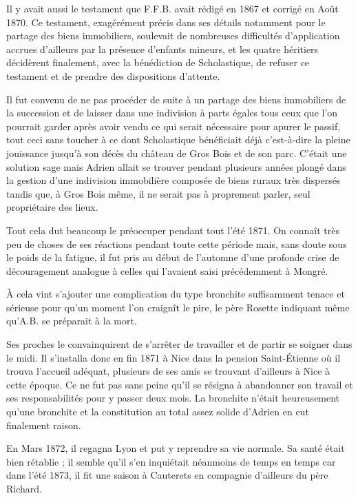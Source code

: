 \documentclass[11pt,a4paper]{report}
\begin{document}
Il y avait aussi le testament que F.F.B. avait rédigé en 1867 et corrigé en Août 1870. Ce testament, exagérément précis dans ses détails notamment pour le partage des biens immobiliers, soulevait de nombreuses difficultés d'application accrues d'ailleurs par la présence d'enfants mineurs, et les quatre héritiers décidèrent finalement, avec la bénédiction de Scholastique, de refuser ce testament et de prendre des dispositions d'attente.

Il fut convenu de ne pas procéder de suite à un partage des biens immobiliers de la succession et de laisser dans une indivision à parts égales tous ceux que l'on pourrait garder après avoir vendu ce qui serait nécessaire pour apurer le passif, tout ceci sans toucher à ce dont Scholastique bénéficiait déjà c'est-à-dire la pleine jouissance jusqu'à son décès du château de Gros Bois et de son parc. C'était une solution sage mais Adrien allait se trouver pendant plusieurs années plongé dans la gestion d'une indivision immobilière composée de biens ruraux très dispersés tandis que, à Gros Bois même, il ne serait pas à proprement parler, seul propriétaire des lieux.

Tout cela dut beaucoup le préoccuper pendant tout l'été 1871. On connaît très peu de choses de ses réactions pendant toute cette période mais, sans doute sous le poids de la fatigue, il fut pris au début de l'automne d'une profonde crise de découragement analogue à celles qui l'avaient saisi précédemment à Mongré.


À cela vint s'ajouter une complication du type bronchite suffisamment tenace et sérieuse pour qu'un moment l'on craignît le pire, le père Rosette indiquant même qu'A.B. se préparait à la mort.

Ses proches le convainquirent de s'arrêter de travailler et de partir se soigner dans le midi. Il s'installa donc en fin 1871 à Nice dans la pension Saint-Étienne où il trouva l'accueil adéquat, plusieurs de ses amis se trouvant d'ailleurs à Nice à cette époque. Ce ne fut pas sans peine qu'il se résigna à abandonner son travail et ses responsabilités pour y passer deux mois. La bronchite n'était heureusement qu'une bronchite et la constitution au total assez solide d'Adrien en eut finalement raison.

En Mars 1872, il regagna Lyon et put y reprendre sa vie normale. Sa santé était bien rétablie ; il semble qu'il s'en inquiétait néanmoins de temps en temps car dans l'été 1873, il fit une saison à Cauterets en compagnie d'ailleurs du père Richard.
\end{document}
